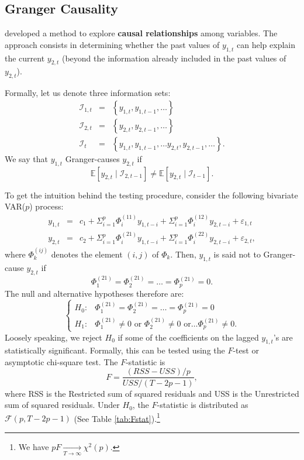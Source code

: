 \documentclass[
  12pt,
]{book}
\theoremstyle{definition}
\theoremstyle{definition}
\theoremstyle{definition}
\theoremstyle{definition}
\theoremstyle{remark}
\begin{document}
\hypertarget{granger-causality}{%
\subsection{Granger Causality}\label{granger-causality}}

\citet{Granger_1969} developed a method to explore \textbf{causal relationships} among variables. The approach consists in determining whether the past values of \(y_{1,t}\) can help explain the current \(y_{2,t}\) (beyond the information already included in the past values of \(y_{2,t}\)).

Formally, let us denote three information sets:
\begin{eqnarray*}
\mathcal{I}_{1,t} & = & \left\{ y_{1,t},y_{1,t-1},\ldots\right\} \\
\mathcal{I}_{2,t} & = & \left\{ y_{2,t},y_{2,t-1},\ldots\right\} \\
\mathcal{I}_{t} & = & \left\{ y_{1,t},y_{1,t-1},\ldots y_{2,t},y_{2,t-1},\ldots\right\}.
\end{eqnarray*}
We say that \(y_{1,t}\) Granger-causes \(y_{2,t}\) if
\[
\mathbb{E}\left[y_{2,t}\mid \mathcal{I}_{2,t-1}\right]\neq \mathbb{E}\left[y_{2,t}\mid \mathcal{I}_{t-1}\right].
\]

To get the intuition behind the testing procedure, consider the following
bivariate VAR(\(p\)) process:
\begin{eqnarray*}
y_{1,t} & = & c_1+\Sigma_{i=1}^{p}\Phi_i^{(11)}y_{1,t-i}+\Sigma_{i=1}^{p}\Phi_i^{(12)}y_{2,t-i}+\varepsilon_{1,t}\\
y_{2,t} & = & c_2+\Sigma_{i=1}^{p}\Phi_i^{(21)}y_{1,t-i}+\Sigma_{i=1}^{p}\Phi_i^{(22)}y_{2,t-i}+\varepsilon_{2,t},
\end{eqnarray*}
where \(\Phi_k^{(ij)}\) denotes the element \((i,j)\) of \(\Phi_k\). Then, \(y_{1,t}\) is said not to Granger-cause \(y_{2,t}\) if
\[
\Phi_1^{(21)}=\Phi_2^{(21)}=\ldots=\Phi_p^{(21)}=0.
\]
The null and alternative hypotheses therefore are:
\[
\begin{cases}
H_{0}: & \Phi_1^{(21)}=\Phi_2^{(21)}=\ldots=\Phi_p^{(21)}=0\\
H_{1}: & \Phi_1^{(21)}\neq0\mbox{ or }\Phi_2^{(21)}\neq0\mbox{ or}\ldots\Phi_p^{(21)}\neq0.\end{cases}
\]
Loosely speaking, we reject \(H_{0}\) if some of the coefficients on the lagged \(y_{1,t}\)'s are statistically significant. Formally, this can be tested using the \(F\)-test or asymptotic chi-square test. The \(F\)-statistic is
\[
F=\frac{(RSS-USS)/p}{USS/(T-2p-1)},
\]
where RSS is the Restricted sum of squared residuals and USS is the Unrestricted sum of squared residuals. Under \(H_{0}\), the \(F\)-statistic is distributed as \(\mathcal{F}(p,T-2p-1)\) (See Table \ref{tab:Fstat}).\footnote{We have \(pF\underset{T \rightarrow \infty}{\rightarrow}\chi^{2}(p)\).}
\end{document}
